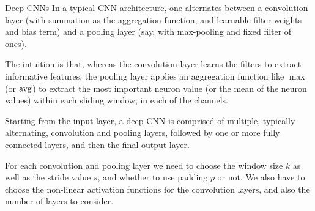 \begin{frame}{Deep CNNs}
In a typical CNN architecture, one alternates between a convolution
layer (with summation as the aggregation function, and learnable filter
weights and bias term) and a pooling layer (say, with max-pooling and
    fixed filter of ones). 

\medskip

The intuition is that, whereas the convolution
    layer learns the filters to extract informative features, the pooling
    layer applies an aggregation function like $\max$ (or $\operatorname{avg}$) to
    extract the most important neuron value (or the mean of the neuron
    values) within
    each sliding window, in each of the channels.



\medskip

    Starting from the input layer, 
a deep CNN is comprised of multiple, typically alternating, convolution
and pooling layers, followed by one or more fully connected layers, and
then the final output layer. 

\medskip

For each convolution and pooling layer we need to
choose the window size $k$ as well as the stride value $s$, and whether
to use padding $p$ or not. We also have to choose the non-linear
activation functions for the convolution layers, and also the number of layers to
consider. 
\end{frame}
%
%
